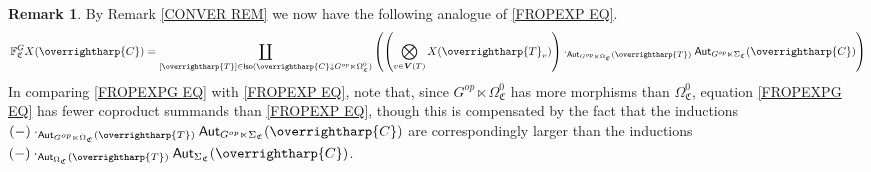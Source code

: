 \documentclass[a4paper,10pt
]{article}%
\numberwithin{equation}{section}
\numberwithin{figure}{section}
\theoremstyle{definition} %
\newtheorem{remark}[equation]{Remark}%
\newcommand{\vect}[1]{\text{\overrightharp{\ensuremath{#1}}}}
\newcommand{\1}{\ensuremath{\mathbbm 1}}%
\begin{document}
\begin{remark}\label{FROPEXPG REM}
	By Remark \ref{CONVER REM} we now have the following analogue of
	\eqref{FROPEXP EQ}.
	\begin{equation}\label{FROPEXPG EQ}
	\mathbb{F}^G_{\mathfrak{C}} X (\vect{C})
	=
	\coprod_{[\vect{T}] \in 
		\mathsf{Iso}(\vect{C} \downarrow G^{op} \ltimes \Omega^0_{\mathfrak{C}})}
	\left(
	\left(
	\bigotimes_{v \in \boldsymbol{V}(T)} X(\vect{T}_v)
	\right)
	\cdot_{\mathsf{Aut}_{G^{op} \ltimes \Omega_{\mathfrak{C}}}(\vect{T})}
	\mathsf{Aut}_{G^{op} \ltimes \Sigma_{\mathfrak{C}}}(\vect{C})
	\right)
	\end{equation}
	In comparing \eqref{FROPEXPG EQ} with \eqref{FROPEXP EQ},
	note that,
	since $G^{op} \ltimes \Omega^0_{\mathfrak{C}}$
	has more morphisms than
	$\Omega^0_{\mathfrak{C}}$,
	equation \eqref{FROPEXPG EQ} has fewer coproduct summands than \eqref{FROPEXP EQ},
	though this is compensated by the fact that the inductions
	$(-)\cdot_{\mathsf{Aut}_{G^{op} \ltimes \Omega_{\mathfrak{C}}}(\vect{T})}
	\mathsf{Aut}_{G^{op} \ltimes \Sigma_{\mathfrak{C}}}(\vect{C})$
	are correspondingly larger than the inductions
	$(-)\cdot_{\mathsf{Aut}_{\Omega_{\mathfrak{C}}}(\vect{T})}
	\mathsf{Aut}_{\Sigma_{\mathfrak{C}}}(\vect{C})$.
\end{remark}
\end{document}
